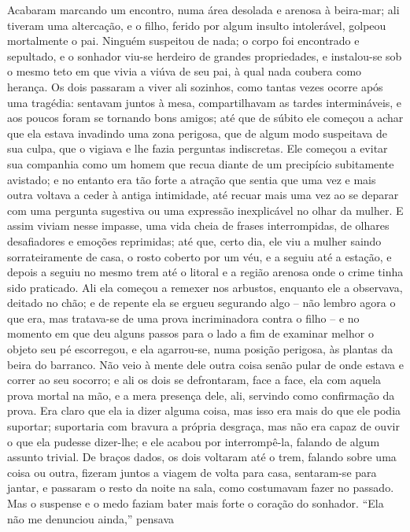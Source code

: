 Acabaram marcando um encontro, numa área desolada e arenosa à beira-mar;
ali tiveram uma altercação, e o filho, ferido por algum insulto
intolerável, golpeou mortalmente o pai.  Ninguém suspeitou de nada; o
corpo foi encontrado e sepultado, e o sonhador viu-se herdeiro de
grandes propriedades, e instalou-se sob o mesmo teto em que vivia a
viúva de seu pai, à qual nada coubera como herança.  Os dois passaram a
viver ali sozinhos, como tantas vezes ocorre após uma tragédia:
sentavam juntos à mesa, compartilhavam as tardes intermináveis, e aos
poucos foram se tornando bons amigos; até que de súbito ele começou a
achar que ela estava invadindo uma zona perigosa, que de algum modo
suspeitava de sua culpa, que o vigiava e lhe fazia perguntas
indiscretas.  Ele começou a evitar sua companhia como um homem que
recua diante de um precipício subitamente avistado; e no entanto era
tão forte a atração que sentia que uma vez e mais outra voltava a ceder
à antiga intimidade, até recuar mais uma vez ao se deparar com uma
pergunta sugestiva ou uma expressão inexplicável no olhar da mulher.  E
assim viviam nesse impasse, uma vida cheia de frases interrompidas, de
olhares desafiadores e emoções reprimidas; até que, certo dia, ele viu
a mulher saindo sorrateiramente de casa, o rosto coberto por um véu, e
a seguiu até a estação, e depois a seguiu no mesmo trem até o litoral e
a região arenosa onde o crime tinha sido praticado.  Ali ela começou a
remexer nos arbustos, enquanto ele a observava, deitado no chão; e de
repente ela se ergueu segurando algo -- não lembro agora o que era, mas
tratava-se de uma prova incriminadora contra o filho -- e no momento em
que deu alguns passos para o lado a fim de examinar melhor o objeto seu
pé escorregou, e ela agarrou-se, numa posição perigosa, às plantas da
beira do barranco.  Não veio à mente dele outra coisa senão pular de
onde estava e correr ao seu socorro; e ali os dois se defrontaram, face
a face, ela com aquela prova mortal na mão, e a mera presença dele,
ali, servindo como confirmação da prova.  Era claro que ela ia dizer
alguma coisa, mas isso era mais do que ele podia suportar; suportaria
com bravura a própria desgraça, mas não era capaz de ouvir o que ela
pudesse dizer-lhe; e ele acabou por interrompê-la, falando de algum
assunto trivial.  De braços dados, os dois voltaram até o trem, falando
sobre uma coisa ou outra, fizeram juntos a viagem de volta para casa,
sentaram-se para jantar, e passaram o resto da noite na sala, como
costumavam fazer no passado.  Mas o suspense e o medo faziam bater mais
forte o coração do sonhador.  “Ela não me denunciou ainda,” pensava
